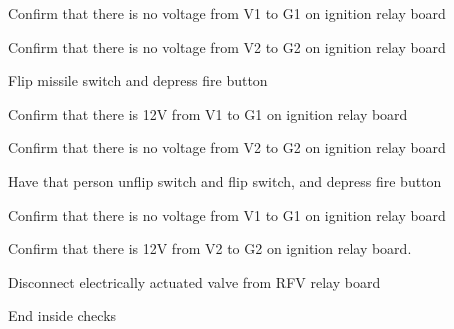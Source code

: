\begin{checklist}
    \item Confirm that there is no voltage from V1 to G1 on ignition relay board
    \item Confirm that there is no voltage from V2 to G2 on ignition relay board
    \item Flip \priarm{} missile switch and depress fire button
    \begin{checklist}
        \item Confirm that there is 12V from V1 to G1 on ignition relay board
        \item Confirm that there is no voltage from V2 to G2 on ignition relay board
    \end{checklist}
    \item Have that person unflip \priarm{} switch and flip \secarm{} switch, 
and depress fire button
    \begin{checklist}
        \item Confirm that there is no voltage from V1 to G1 on ignition relay board
        \item Confirm that there is 12V from V2 to G2 on ignition relay board.
    \end{checklist}

    \item Disconnect electrically actuated valve from RFV relay board

End inside checks

\end{checklist}

